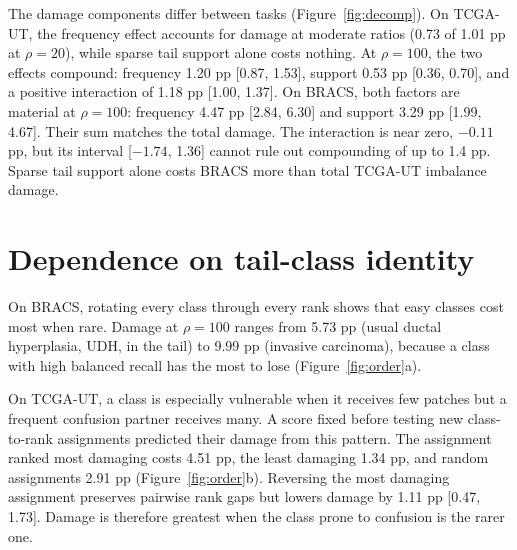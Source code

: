 \documentclass[11pt]{article}
\begin{document}
\noindent The damage components differ between tasks (Figure~\ref{fig:decomp}). On TCGA-UT, the frequency effect accounts for damage at moderate ratios (0.73 of 1.01 pp at $\rho=20$), while sparse tail support alone costs nothing. At $\rho=100$, the two effects compound: frequency 1.20 pp [0.87, 1.53], support 0.53 pp [0.36, 0.70], and a positive interaction of 1.18 pp [1.00, 1.37]. On BRACS, both factors are material at $\rho=100$: frequency 4.47 pp [2.84, 6.30] and support 3.29 pp [1.99, 4.67]. Their sum matches the total damage. The interaction is near zero, $-0.11$ pp, but its interval [$-1.74$, 1.36] cannot rule out compounding of up to 1.4 pp. Sparse tail support alone costs BRACS more than total TCGA-UT imbalance damage.

\section{Dependence on tail-class identity}

On BRACS, rotating every class through every rank shows that easy classes cost most when rare. Damage at $\rho=100$ ranges from 5.73 pp (usual ductal hyperplasia, UDH, in the tail) to 9.99 pp (invasive carcinoma), because a class with high balanced recall has the most to lose (Figure~\ref{fig:order}a).

On TCGA-UT, a class is especially vulnerable when it receives few patches but a frequent confusion partner receives many. A score fixed before testing new class-to-rank assignments predicted their damage from this pattern. The assignment ranked most damaging costs 4.51 pp, the least damaging 1.34 pp, and random assignments 2.91 pp (Figure~\ref{fig:order}b). Reversing the most damaging assignment preserves pairwise rank gaps but lowers damage by 1.11 pp [0.47, 1.73]. Damage is therefore greatest when the class prone to confusion is the rarer one.
\end{document}

